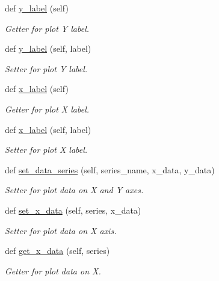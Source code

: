 \begin{DoxyCompactItemize}
def \mbox{\hyperlink{classbridges_1_1line__chart_1_1_line_chart_a53234b2386393ec400bfbc969e8a5bf2}{y\+\_\+label}} (self)
\begin{DoxyCompactList}\small\item\em Getter for plot Y label. \end{DoxyCompactList}\item 
def \mbox{\hyperlink{classbridges_1_1line__chart_1_1_line_chart_a13a80664727dc3302e7f7d4b29b58833}{y\+\_\+label}} (self, label)
\begin{DoxyCompactList}\small\item\em Setter for plot Y label. \end{DoxyCompactList}\item 
def \mbox{\hyperlink{classbridges_1_1line__chart_1_1_line_chart_a37436d14c6c63116d0d1540ea8ef7fc1}{x\+\_\+label}} (self)
\begin{DoxyCompactList}\small\item\em Getter for plot X label. \end{DoxyCompactList}\item 
def \mbox{\hyperlink{classbridges_1_1line__chart_1_1_line_chart_ad30576a90dcc406c46efb5902fee86f1}{x\+\_\+label}} (self, label)
\begin{DoxyCompactList}\small\item\em Setter for plot X label. \end{DoxyCompactList}\item 
def \mbox{\hyperlink{classbridges_1_1line__chart_1_1_line_chart_a989930527e9981b9d12cb0b56aefba76}{set\+\_\+data\+\_\+series}} (self, series\+\_\+name, x\+\_\+data, y\+\_\+data)
\begin{DoxyCompactList}\small\item\em Setter for plot data on X and Y axes. \end{DoxyCompactList}\item 
def \mbox{\hyperlink{classbridges_1_1line__chart_1_1_line_chart_a74651645a41825887e8775a456176eac}{set\+\_\+x\+\_\+data}} (self, series, x\+\_\+data)
\begin{DoxyCompactList}\small\item\em Setter for plot data on X axis. \end{DoxyCompactList}\item 
def \mbox{\hyperlink{classbridges_1_1line__chart_1_1_line_chart_af1f00a86504734b3f1a8209c66052422}{get\+\_\+x\+\_\+data}} (self, series)
\begin{DoxyCompactList}\small\item\em Getter for plot data on X. \end{DoxyCompactList}\item 

\end{DoxyCompactItemize}
